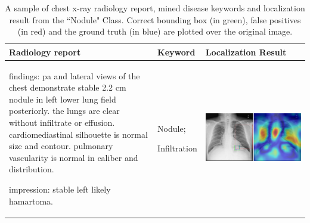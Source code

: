 \documentclass[10pt,twocolumn,letterpaper]{article}
\begin{document}
\begin{table}
	\begin{center}
		\begin{tabular}{p{15em}|p{6em}|p{23em}}
			\hline
			Radiology report & Keyword & Localization Result\\
			\hline\hline
			findings: pa and lateral views of the chest demonstrate stable 2.2 cm nodule in left lower lung field posteriorly. the lungs are clear without infiltrate or effusion. cardiomediastinal silhouette is normal size and contour. pulmonary vascularity is normal in caliber and distribution. 
			
			impression: stable left likely hamartoma.
			& Nodule;
			
			Infiltration
			&\vspace{0cm}\includegraphics[width=1\linewidth]{00138571_01_c_6.png} \\
			\hline
		\end{tabular}
	\end{center}
	\caption{A sample of chest x-ray radiology report, mined disease keywords and localization result from the ``Nodule" Class. Correct bounding box (in green), false positives (in red) and the ground truth (in blue) are plotted over the original image.}
	\label{tab:Loc_example_6}
\end{table}
\end{document}
